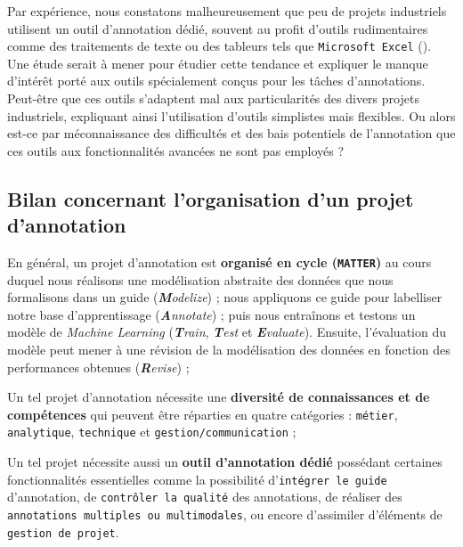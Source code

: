 		\begin{leftBarAuthorOpinion}
			Par expérience, nous constatons malheureusement que peu de projets industriels utilisent un outil d'annotation dédié, souvent au profit d'outils rudimentaires comme des traitements de texte ou des tableurs tels que \texttt{Microsoft Excel} (\cite{microsoft-corporation:2018:microsoft-excel}).
			Une étude serait à mener pour étudier cette tendance et expliquer le manque d'intérêt porté aux outils spécialement conçus pour les tâches d'annotations.
			Peut-être que ces outils s'adaptent mal aux particularités des divers projets industriels, expliquant ainsi l'utilisation d'outils simplistes mais flexibles. Ou alors est-ce par méconnaissance des difficultés et des bais potentiels de l'annotation que ces outils aux fonctionnalités avancées ne sont pas employés ?
		\end{leftBarAuthorOpinion}
	
	
	\subsection{Bilan concernant l'organisation d'un projet d'annotation}
	\label{section:2.2.4-ORGANISATION-ANNOTATION-BILAN}
	
	\begin{leftBarSummary}
		\begin{todolist}
			\item[\itemok] En général, un projet d'annotation est \textbf{organisé en cycle (\texttt{MATTER})} au cours duquel nous réalisons une modélisation abstraite des données que nous formalisons dans un guide (\textit{\textbf{M}odelize}) ; nous appliquons ce guide pour labelliser notre base d'apprentissage (\textit{\textbf{A}nnotate}) ; puis nous entraînons et testons un modèle de \textit{Machine Learning} (\textit{\textbf{T}rain}, \textit{\textbf{T}est} et \textit{\textbf{E}valuate}).
			Ensuite, l'évaluation du modèle peut mener à une révision de la modélisation des données en fonction des performances obtenues (\textit{\textbf{R}evise}) ;
			\item[\itemok] Un tel projet d'annotation nécessite une \textbf{diversité de connaissances et de compétences} qui peuvent être réparties en quatre catégories : \texttt{métier}, \texttt{analytique}, \texttt{technique} et \texttt{gestion/communication} ;
			\item[\itemok] Un tel projet nécessite aussi un \textbf{outil d'annotation dédié} possédant certaines fonctionnalités essentielles comme la possibilité d'\texttt{intégrer le guide} d'annotation, de \texttt{contrôler la qualité} des annotations, de réaliser des \texttt{annotations multiples ou multimodales}, ou encore d'assimiler d'éléments de \texttt{gestion de projet}.
		\end{todolist}
	\end{leftBarSummary}